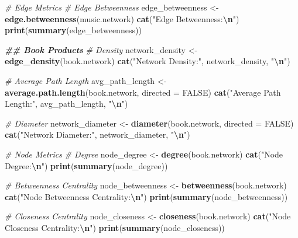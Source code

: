 \documentclass[
]{article}
\newenvironment{Shaded}{\begin{snugshade}}{\end{snugshade}}
\newcommand{\AttributeTok}[1]{\textcolor[rgb]{0.13,0.29,0.53}{#1}}
\newcommand{\CommentTok}[1]{\textcolor[rgb]{0.56,0.35,0.01}{\textit{#1}}}
\newcommand{\ConstantTok}[1]{\textcolor[rgb]{0.56,0.35,0.01}{#1}}
\newcommand{\DocumentationTok}[1]{\textcolor[rgb]{0.56,0.35,0.01}{\textbf{\textit{#1}}}}
\newcommand{\FunctionTok}[1]{\textcolor[rgb]{0.13,0.29,0.53}{\textbf{#1}}}
\newcommand{\NormalTok}[1]{#1}
\newcommand{\OtherTok}[1]{\textcolor[rgb]{0.56,0.35,0.01}{#1}}
\newcommand{\SpecialCharTok}[1]{\textcolor[rgb]{0.81,0.36,0.00}{\textbf{#1}}}
\newcommand{\StringTok}[1]{\textcolor[rgb]{0.31,0.60,0.02}{#1}}
\begin{document}
\begin{Shaded}
\begin{Highlighting}[]
\CommentTok{\# Edge Metrics}
\CommentTok{\# Edge Betweenness}
\NormalTok{edge\_betweenness }\OtherTok{\textless{}{-}} \FunctionTok{edge.betweenness}\NormalTok{(music.network)}
\FunctionTok{cat}\NormalTok{(}\StringTok{"Edge Betweenness:}\SpecialCharTok{\textbackslash{}n}\StringTok{"}\NormalTok{)}
\FunctionTok{print}\NormalTok{(}\FunctionTok{summary}\NormalTok{(edge\_betweenness))}

\DocumentationTok{\#\# Book Products}
\CommentTok{\# Density}
\NormalTok{network\_density }\OtherTok{\textless{}{-}} \FunctionTok{edge\_density}\NormalTok{(book.network)}
\FunctionTok{cat}\NormalTok{(}\StringTok{"Network Density:"}\NormalTok{, network\_density, }\StringTok{"}\SpecialCharTok{\textbackslash{}n}\StringTok{"}\NormalTok{)}

\CommentTok{\# Average Path Length}
\NormalTok{avg\_path\_length }\OtherTok{\textless{}{-}} \FunctionTok{average.path.length}\NormalTok{(book.network, }\AttributeTok{directed =} \ConstantTok{FALSE}\NormalTok{)}
\FunctionTok{cat}\NormalTok{(}\StringTok{"Average Path Length:"}\NormalTok{, avg\_path\_length, }\StringTok{"}\SpecialCharTok{\textbackslash{}n}\StringTok{"}\NormalTok{)}

\CommentTok{\# Diameter}
\NormalTok{network\_diameter }\OtherTok{\textless{}{-}} \FunctionTok{diameter}\NormalTok{(book.network, }\AttributeTok{directed =} \ConstantTok{FALSE}\NormalTok{)}
\FunctionTok{cat}\NormalTok{(}\StringTok{"Network Diameter:"}\NormalTok{, network\_diameter, }\StringTok{"}\SpecialCharTok{\textbackslash{}n}\StringTok{"}\NormalTok{)}

\CommentTok{\# Node Metrics}
\CommentTok{\# Degree}
\NormalTok{node\_degree }\OtherTok{\textless{}{-}} \FunctionTok{degree}\NormalTok{(book.network)}
\FunctionTok{cat}\NormalTok{(}\StringTok{"Node Degree:}\SpecialCharTok{\textbackslash{}n}\StringTok{"}\NormalTok{)}
\FunctionTok{print}\NormalTok{(}\FunctionTok{summary}\NormalTok{(node\_degree))}

\CommentTok{\# Betweenness Centrality}
\NormalTok{node\_betweenness }\OtherTok{\textless{}{-}} \FunctionTok{betweenness}\NormalTok{(book.network)}
\FunctionTok{cat}\NormalTok{(}\StringTok{"Node Betweenness Centrality:}\SpecialCharTok{\textbackslash{}n}\StringTok{"}\NormalTok{)}
\FunctionTok{print}\NormalTok{(}\FunctionTok{summary}\NormalTok{(node\_betweenness))}

\CommentTok{\# Closeness Centrality}
\NormalTok{node\_closeness }\OtherTok{\textless{}{-}} \FunctionTok{closeness}\NormalTok{(book.network)}
\FunctionTok{cat}\NormalTok{(}\StringTok{"Node Closeness Centrality:}\SpecialCharTok{\textbackslash{}n}\StringTok{"}\NormalTok{)}
\FunctionTok{print}\NormalTok{(}\FunctionTok{summary}\NormalTok{(node\_closeness))}


\end{Highlighting}
\end{Shaded}
\end{document}
